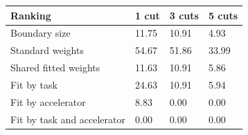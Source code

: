 \begin{tabular}{@{}llll@{}}
\toprule
Ranking & 1 cut & 3 cuts & 5 cuts \\
\midrule
Boundary size & 11.75 & 10.91 & 4.93 \\
Standard weights & 54.67 & 51.86 & 33.99 \\
Shared fitted weights & 11.63 & 10.91 & 5.86 \\
Fit by task & 24.63 & 10.91 & 5.94 \\
Fit by accelerator & 8.83 & 0.00 & 0.00 \\
Fit by task and accelerator & 0.00 & 0.00 & 0.00 \\
\bottomrule
\end{tabular}
